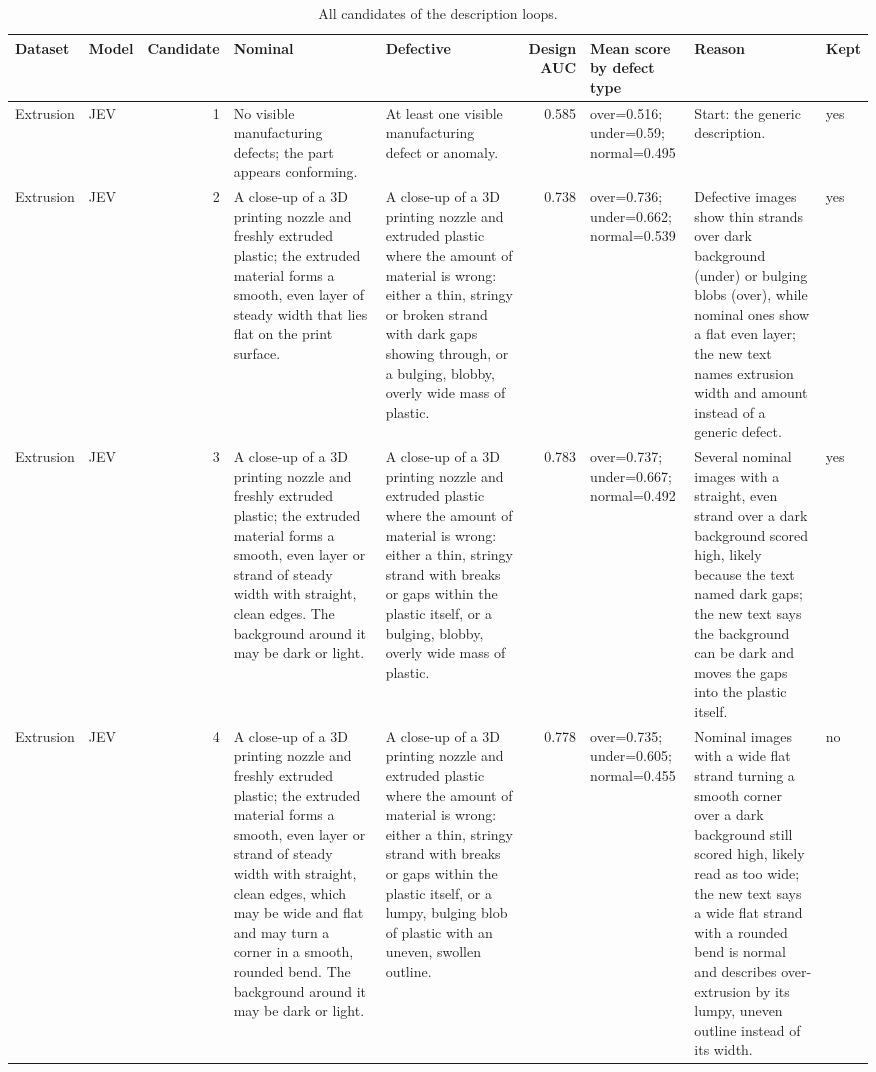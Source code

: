 \begin{table}

\caption{\label{tab:tbl-candidates}All candidates of the description loops.}
\centering
\begin{tabular}[t]{llrllrlll}
\toprule
Dataset & Model & Candidate & Nominal & Defective & Design AUC & Mean score by defect type & Reason & Kept\\
\midrule
Extrusion & JEV & 1 & No visible manufacturing defects; the part appears conforming. & At least one visible manufacturing defect or anomaly. & 0.585 & over=0.516; under=0.59; normal=0.495 & Start: the generic description. & yes\\
Extrusion & JEV & 2 & A close-up of a 3D printing nozzle and freshly extruded plastic; the extruded material forms a smooth, even layer of steady width that lies flat on the print surface. & A close-up of a 3D printing nozzle and extruded plastic where the amount of material is wrong: either a thin, stringy or broken strand with dark gaps showing through, or a bulging, blobby, overly wide mass of plastic. & 0.738 & over=0.736; under=0.662; normal=0.539 & Defective images show thin strands over dark background (under) or bulging blobs (over), while nominal ones show a flat even layer; the new text names extrusion width and amount instead of a generic defect. & yes\\
Extrusion & JEV & 3 & A close-up of a 3D printing nozzle and freshly extruded plastic; the extruded material forms a smooth, even layer or strand of steady width with straight, clean edges. The background around it may be dark or light. & A close-up of a 3D printing nozzle and extruded plastic where the amount of material is wrong: either a thin, stringy strand with breaks or gaps within the plastic itself, or a bulging, blobby, overly wide mass of plastic. & 0.783 & over=0.737; under=0.667; normal=0.492 & Several nominal images with a straight, even strand over a dark background scored high, likely because the text named dark gaps; the new text says the background can be dark and moves the gaps into the plastic itself. & yes\\
Extrusion & JEV & 4 & A close-up of a 3D printing nozzle and freshly extruded plastic; the extruded material forms a smooth, even layer or strand of steady width with straight, clean edges, which may be wide and flat and may turn a corner in a smooth, rounded bend. The background around it may be dark or light. & A close-up of a 3D printing nozzle and extruded plastic where the amount of material is wrong: either a thin, stringy strand with breaks or gaps within the plastic itself, or a lumpy, bulging blob of plastic with an uneven, swollen outline. & 0.778 & over=0.735; under=0.605; normal=0.455 & Nominal images with a wide flat strand turning a smooth corner over a dark background still scored high, likely read as too wide; the new text says a wide flat strand with a rounded bend is normal and describes over-extrusion by its lumpy, uneven outline instead of its width. & no\\

\end{tabular}
\end{table}
